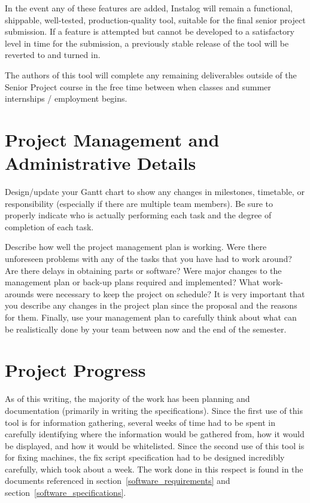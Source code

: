 \documentclass[letterpaper,12pt]{article}
\begin{document}
In the event any of these features are added, Instalog will remain a functional,
shippable, well-tested, production-quality tool, suitable for the final senior
project submission.  If a feature is attempted but cannot be developed to a
satisfactory level in time for the submission, a previously stable release of
the tool will be reverted to and turned in.  

The authors of this tool will complete any remaining deliverables outside of the
Senior Project course in the free time between when classes and summer
internships / employment begins.  

\newpage



\section{Project Management and Administrative Details}
\label{project_management} 
Design/update your Gantt chart to show any changes in
milestones, timetable, or responsibility (especially if there are multiple team members). Be sure to
properly indicate who is actually performing each task and the degree of
completion of each task.

Describe how well the project management plan is working. Were there unforeseen
problems with any of the tasks that you have had to work around? Are there
delays in obtaining parts or software? Were major changes to the management plan
or back-up plans required and implemented? What work-arounds were necessary to
keep the project on schedule? It is very important that you describe any changes
in the project plan since the proposal and the reasons for them.
Finally, use your management plan to carefully think about what can be
realistically done by your team between now and the end of the semester.

\newpage



\section{Project Progress} \label{project_progress}
As of this writing, the majority of the work has been planning and documentation
(primarily in writing the specifications).  Since the first use of this tool is
for information gathering, several weeks of time had to be spent in carefully
identifying where the information would be gathered from, how it would be
displayed, and how it would be whitelisted.  Since the second use of this tool
is for fixing machines, the fix script specification had to be designed
incredibly carefully, which took about a week.  The work done in this respect is
found in the documents referenced in section~\ref{software_requirements} and
section~\ref{software_specifications}.  
\end{document}
